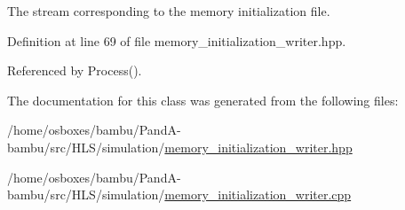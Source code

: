 The stream corresponding to the memory initialization file. 



Definition at line 69 of file memory\+\_\+initialization\+\_\+writer.\+hpp.



Referenced by Process().



The documentation for this class was generated from the following files\+:\begin{DoxyCompactItemize}
\item 
/home/osboxes/bambu/\+Pand\+A-\/bambu/src/\+H\+L\+S/simulation/\hyperlink{memory__initialization__writer_8hpp}{memory\+\_\+initialization\+\_\+writer.\+hpp}\item 
/home/osboxes/bambu/\+Pand\+A-\/bambu/src/\+H\+L\+S/simulation/\hyperlink{memory__initialization__writer_8cpp}{memory\+\_\+initialization\+\_\+writer.\+cpp}\end{DoxyCompactItemize}
